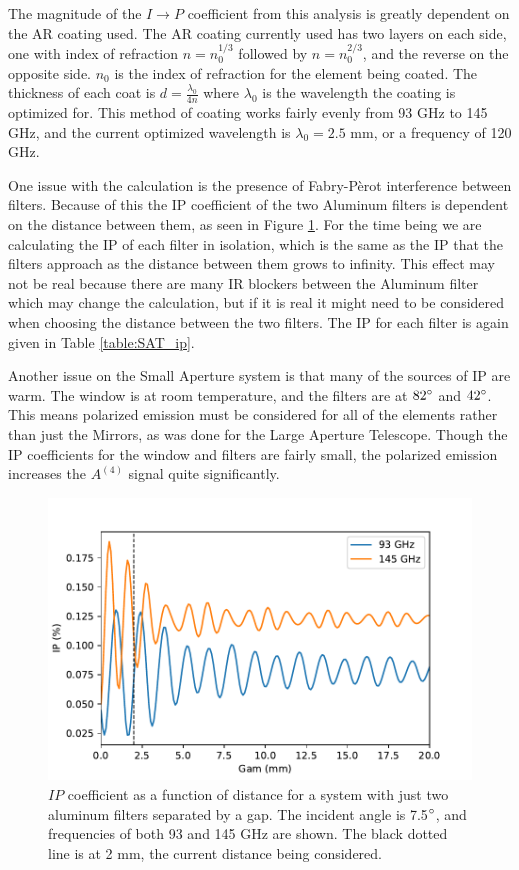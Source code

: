 \documentclass{article}
\theoremstyle{remark}
\newcommand{\A}[1]{A^{(#1)}}
\newcommand{\ip}{$I\rightarrow P$ }
\begin{document}
The magnitude of the \ip coefficient from this analysis is greatly dependent on the AR coating used. 
The AR coating currently used has two layers on each side, one with index of refraction $n = n_0^{1/3}$ followed by $n = n_0^{2/3}$, and the reverse on the opposite side.
$n_0$ is the index of refraction for the element being coated.
The thickness of each coat is $d = \frac{\lambda_0}{4 n}$ where $\lambda_0$ is the wavelength the coating is optimized for. 
This method of coating works fairly evenly from 93 GHz to 145 GHz, and the current optimized wavelength is $\lambda_0 = 2.5$ mm, or a frequency of 120 GHz.



One issue with the calculation is the presence of Fabry-P\`{e}rot interference between filters.
Because of this the IP coefficient of the two Aluminum filters is dependent on the distance between them, as seen in Figure \ref{fig:IP_vs_distance}.
For the time being we are calculating the IP of each filter in isolation, which is the same as the IP that the filters approach as the distance between them grows to infinity.
This effect may not be real because there are many IR blockers between the Aluminum filter which may change the calculation, 
but if it is real it might need to be considered when choosing the distance between the two filters.
The IP for each filter is again given in Table \ref{table:SAT_ip}.

Another issue on the Small Aperture system is that many of the sources of IP are warm.
The window is at room temperature, and the filters are at $82\degree$ and $42\degree$.
This means polarized emission must be considered for all of the elements rather than just the Mirrors, as was done for the Large Aperture Telescope. 
Though the IP coefficients for the window and filters are fairly small,
the polarized emission increases the $\A4$ signal quite significantly.

\begin{figure}[t!]
	\centering
  \includegraphics[width=.8\linewidth]{ip_vs_gap_filter_only.pdf}
  \caption{$IP$ coefficient as a function of distance for a system with just two aluminum filters separated by a gap.
  The incident angle is 7.5$\degree$, and frequencies of both 93 and 145 GHz are shown. 
  The black dotted line is at 2 mm, the current distance being considered.
  }
  \label{fig:IP_vs_distance}
\end{figure}
\end{document}
